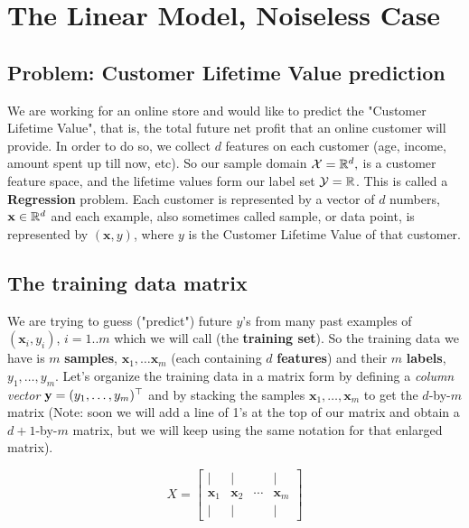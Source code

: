 \section{The Linear Model, Noiseless Case}
\subsection{Problem: Customer Lifetime Value prediction}
We are working for an online store and would like to predict the "Customer Lifetime Value", that is, the total future net profit that an online customer will provide. In order to do so, we collect $d$ features on each customer (age, income, amount spent up till now, etc).
So our sample domain $\mathcal{X}=\mathbb{R}^d,$  is a customer feature space, and the lifetime values form our label set $\mathcal{Y}=\mathbb{R}$. This is called a \textbf{Regression} problem.
Each customer is represented by a vector of $d$ numbers, $\mathbf{x}\in\mathbb{R}^d$ and each example, also sometimes called sample, or data point, is represented by $(\mathbf{x},y)$, where $y$ is the Customer Lifetime Value of that customer.

\subsection{The training data matrix}
We are trying to guess ("predict") future $y$'s from many past examples of $(\mathbf{x}_i,y_i)$, $i=1..m$ which we will call (the \textbf{training set}).
So the training data we have is  $m$ \textbf{samples}, $\mathbf{x}_1,\ldots \mathbf{x}_m$ (each containing $d$ \textbf{features})  and their $m$  \textbf{labels}, $y_1,\ldots,y_m$.
Let's organize the training data in a matrix form by defining a \emph{column vector} $\mathbf{y}=(y_1,\ldots,y_m)^{\top}$ and by stacking the samples $\mathbf{x}_1,\ldots,\mathbf{x}_m$  to get the $d$-by-$m$ matrix (Note: soon we will add a line of 1's at the top of our matrix and obtain a $d+1$-by-$m$ matrix, but we will keep using the same notation for that enlarged matrix).

  \[
 X =
\left[
  \begin{array}{cccc}
    |& | & & | \\
    \mathbf{x}_1 & \mathbf{x}_2 & \cdots & \mathbf{x}_m \\
 |& | & & |
  \end{array}
\right]
\]





